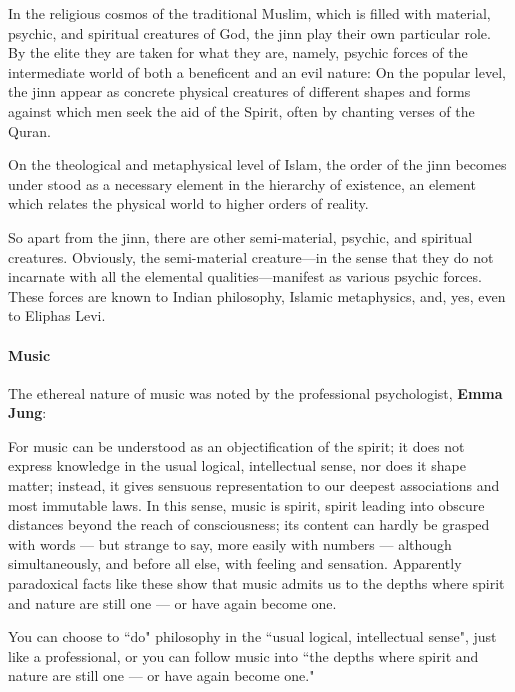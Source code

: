 \begin{quotex}
In the religious cosmos of the traditional Muslim, which is filled with material, psychic, and spiritual creatures of God, the jinn play their own particular role. By the elite they are taken for what they are, namely, psychic forces of the intermediate world of both a beneficent and an evil nature: On the popular level, the jinn appear as concrete physical creatures of different shapes and forms against which men seek the aid of the Spirit, often by chanting verses of the Quran.

On the theological and metaphysical level of Islam, the order of the jinn becomes under stood as a necessary element in the hierarchy of existence, an element which relates the physical world to higher orders of reality.

\end{quotex}
So apart from the jinn, there are other semi-material, psychic, and spiritual creatures. Obviously, the semi-material creature—in the sense that they do not incarnate with all the elemental qualities—manifest as various psychic forces. These forces are known to Indian philosophy, Islamic metaphysics, and, yes, even to Eliphas Levi.

\paragraph{Music}
The ethereal nature of music was noted by the professional psychologist, \textbf{Emma Jung}:

\begin{quotex}
For music can be understood as an objectification of the spirit; it does not express knowledge in the usual logical, intellectual sense, nor does it shape matter; instead, it gives sensuous representation to our deepest associations and most immutable laws. In this sense, music is spirit, spirit leading into obscure distances beyond the reach of consciousness; its content can hardly be grasped with words — but strange to say, more easily with numbers — although simultaneously, and before all else, with feeling and sensation. Apparently paradoxical facts like these show that music admits us to the depths where spirit and nature are still one — or have again become one. 

\end{quotex}
You can choose to ``do" philosophy in the ``usual logical, intellectual sense", just like a professional, or you can follow music into ``the depths where spirit and nature are still one — or have again become one."

